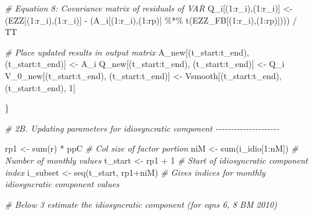 \documentclass[
]{article}
\newenvironment{Shaded}{\begin{snugshade}}{\end{snugshade}}
\newcommand{\CommentTok}[1]{\textcolor[rgb]{0.56,0.35,0.01}{\textit{#1}}}
\newcommand{\DecValTok}[1]{\textcolor[rgb]{0.00,0.00,0.81}{#1}}
\newcommand{\FunctionTok}[1]{\textcolor[rgb]{0.00,0.00,0.00}{#1}}
\newcommand{\NormalTok}[1]{#1}
\newcommand{\OtherTok}[1]{\textcolor[rgb]{0.56,0.35,0.01}{#1}}
\newcommand{\SpecialCharTok}[1]{\textcolor[rgb]{0.00,0.00,0.00}{#1}}
\begin{document}
\begin{Shaded}
\begin{Highlighting}[]
    \CommentTok{\# Equation 8: Covariance matrix of residuals of VAR}
\NormalTok{    Q\_i[(}\DecValTok{1}\SpecialCharTok{:}\NormalTok{r\_i),(}\DecValTok{1}\SpecialCharTok{:}\NormalTok{r\_i)] }\OtherTok{\textless{}{-}}\NormalTok{ (EZZ[(}\DecValTok{1}\SpecialCharTok{:}\NormalTok{r\_i),(}\DecValTok{1}\SpecialCharTok{:}\NormalTok{r\_i)] }\SpecialCharTok{{-}}\NormalTok{ (A\_i[(}\DecValTok{1}\SpecialCharTok{:}\NormalTok{r\_i),(}\DecValTok{1}\SpecialCharTok{:}\NormalTok{rp)] }\SpecialCharTok{\%*\%} \FunctionTok{t}\NormalTok{(EZZ\_FB[(}\DecValTok{1}\SpecialCharTok{:}\NormalTok{r\_i),(}\DecValTok{1}\SpecialCharTok{:}\NormalTok{rp)]))) }\SpecialCharTok{/}\NormalTok{ TT}
    
    \CommentTok{\# Place updated results in output matrix}
\NormalTok{    A\_new[(t\_start}\SpecialCharTok{:}\NormalTok{t\_end), (t\_start}\SpecialCharTok{:}\NormalTok{t\_end)] }\OtherTok{\textless{}{-}}\NormalTok{ A\_i}
\NormalTok{    Q\_new[(t\_start}\SpecialCharTok{:}\NormalTok{t\_end), (t\_start}\SpecialCharTok{:}\NormalTok{t\_end)] }\OtherTok{\textless{}{-}}\NormalTok{ Q\_i}
\NormalTok{    V\_0\_new[(t\_start}\SpecialCharTok{:}\NormalTok{t\_end), (t\_start}\SpecialCharTok{:}\NormalTok{t\_end)] }\OtherTok{\textless{}{-}}\NormalTok{ Vsmooth[(t\_start}\SpecialCharTok{:}\NormalTok{t\_end), (t\_start}\SpecialCharTok{:}\NormalTok{t\_end), }\DecValTok{1}\NormalTok{]}
    
\NormalTok{  \}}
  
  \CommentTok{\# 2B. Updating parameters for idiosyncratic component {-}{-}{-}{-}{-}{-}{-}{-}{-}{-}{-}{-}{-}{-}{-}{-}{-}{-}{-}{-}{-}}
  
\NormalTok{  rp1 }\OtherTok{\textless{}{-}} \FunctionTok{sum}\NormalTok{(r) }\SpecialCharTok{*}\NormalTok{ ppC }\CommentTok{\# Col size of factor portion}
\NormalTok{  niM }\OtherTok{\textless{}{-}} \FunctionTok{sum}\NormalTok{(i\_idio[}\DecValTok{1}\SpecialCharTok{:}\NormalTok{nM]) }\CommentTok{\# Number of monthly values}
\NormalTok{  t\_start }\OtherTok{\textless{}{-}}\NormalTok{ rp1 }\SpecialCharTok{+} \DecValTok{1} \CommentTok{\# Start of idiosyncratic component index}
\NormalTok{  i\_subset }\OtherTok{\textless{}{-}} \FunctionTok{seq}\NormalTok{(t\_start, rp1}\SpecialCharTok{+}\NormalTok{niM) }\CommentTok{\# Gives indices for monthly idiosyncratic component values}
  
  \CommentTok{\# Below 3 estimate the idiosyncratic component (for eqns 6, 8 BM 2010)}
  

\end{Highlighting}
\end{Shaded}
\end{document}
